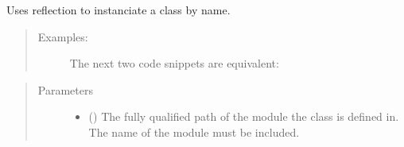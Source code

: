 \documentclass[letterpaper,10pt,english]{sphinxmanual}
\begin{document}
\begin{fulllineitems}
\label{\detokenize{app.utils:app.utils.convertions.class_name_to_obj}}
Uses reflection to instanciate a class by name.
\begin{quote}
\begin{description}
\item[{Examples:}] \leavevmode
The next two code snippets are equivalent:

\begin{sphinxVerbatim}[commandchars=\\\{\}]
  \PYG{p}{[}  \PYG{p}{]}
\end{sphinxVerbatim}

\begin{sphinxVerbatim}[commandchars=\\\{\}]
   
    
\end{sphinxVerbatim}

\end{description}
\end{quote}
\begin{quote}\begin{description}
\item[{Parameters}] \leavevmode\begin{itemize}
\item {} 
 () \textendash{} The fully qualified path of the module the class is defined in.
The name of the module must be included.


\end{itemize}
\end{description}
\end{quote}
\end{fulllineitems}
\end{document}
